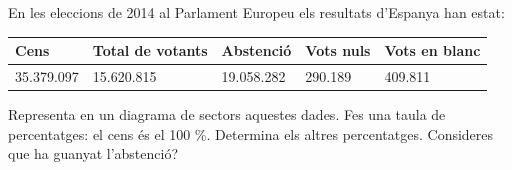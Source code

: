 \begin{mylist}
\exer  En les eleccions de 2014 al Parlament Europeu els resultats d'Espanya han estat: 

\begin{longtable}{|p{0.9in}|p{0.9in}|p{0.9in}|p{0.9in}|p{0.9in}|} \hline 
Cens & Total de votants & Abstenció & Vots nuls & Vots en blanc \\ \hline 
35.379.097 & 15.620.815 & 19.058.282 & 290.189 & 409.811 \\ \hline 
\end{longtable}

Representa en un diagrama de sectors aquestes dades. Fes una taula de percentatges: el cens és el 100 \%. Determina els altres percentatges. Consideres que ha guanyat l'abstenció?

   

\end{mylist} 

